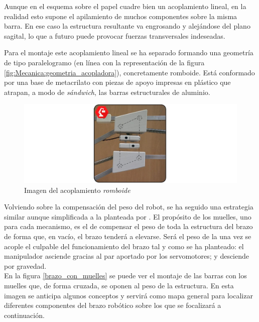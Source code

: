     Aunque en el esquema sobre el papel cuadre bien un acoplamiento lineal, en la realidad esto supone el apilamiento de muchos componentes sobre la misma barra. En ese caso la estructura resultante va engrosando y alejándose del plano sagital, lo que a futuro puede provocar fuerzas transversales indeseadas. 
    
    Para el montaje este acoplamiento lineal se ha separado formando una geometría de tipo paralelogramo (en línea con la representación de la figura \ref{fig:Mecanica:geometria_acopladora}), concretamente romboide. Está conformado por una base de metacrilato con piezas de apoyo impresas en plástico que atrapan, a modo de \textit{sándwich}, las barras estructurales de aluminio.

    \begin{figure}[H]
        \centering
        \includegraphics[width=\textwidth]{figuras/Imagenes_Mecanica/acoplamiento_romboide.jpg}
        \caption{Imagen del acoplamiento \textit{romboide}}
        \label{fig:Mecanica:acoplamiento_romboide}
    \end{figure}

    Volviendo sobre la compensación del peso del robot, se ha seguido una estrategia similar aunque simplificada a la planteada por \cite{Rahman_asimple}. El propósito de los muelles, uno para cada mecanismo, es el de compensar el peso de toda la estructura del brazo de forma que, en vacío, el brazo tenderá a elevarse. Será el peso de la  una vez se acople el culpable del funcionamiento del brazo tal y como se ha planteado: el manipulador asciende gracias al par aportado por los servomotores; y desciende por gravedad.
    \\

    En la figura \ref{brazo_con_muelles} se puede ver el montaje de las barras con los muelles que, de forma cruzada, se oponen al peso de la estructura. En esta imagen se anticipa algunos conceptos y servirá como mapa general para localizar diferentes componentes del brazo robótico sobre los que se focalizará a continuación.

